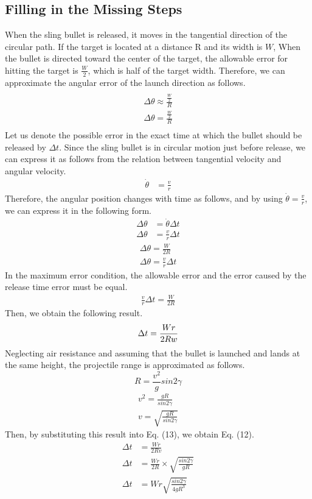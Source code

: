 \documentclass[11pt,letterpaper]{article}
\begin{document}
\subsection{Filling in the Missing Steps}
When the sling bullet is released, it moves in the tangential direction of the circular path. If the target is located at a distance R and its width is $W$, When the bullet is directed toward the center of the target, the allowable error for hitting the target is $\frac{W}{2}$, which is half of the target width. Therefore, we can approximate the angular error of the launch direction as follows.
\begin{align*}
\\
\Delta\theta\approx \frac{\frac{W}{2}}{R}\\[0.5em]
\Delta\theta= \frac{\frac{W}{2}}{R}\\
\end{align*}
Let us denote the possible error in the exact time at which the bullet should be released by $\Delta t$. Since the sling bullet is in circular motion just before release, we can express it as follows from the relation between tangential velocity and angular velocity.
\begin{align*}
\dot{\theta}&=\frac{v}{r}
\end{align*}
Therefore, the angular position changes with time as follows, and by using $\dot{\theta}=\frac{v}{r}$, we can express it in the following form.
\begin{align*}
\Delta\theta&=\dot{\theta}\Delta t\\
\Delta\theta&=\frac{v}{r}\Delta t
\end{align*}
\begin{align*}
\Delta\theta = \frac{W}{2R}\\[0.5em]
\Delta\theta = \frac{v}{r}{\Delta t}
\end{align*}
In the maximum error condition, the allowable error and the error caused by the release time error must be equal.
\begin{align*}
\frac{v}{r}\Delta t= \frac{W}{2R}
\end{align*}
Then, we obtain the following result.
\begin{equation}
\Delta t = \frac{Wr}{2Rw}\\[0.5em]
\end{equation}
Neglecting air resistance and assuming that the bullet is launched and lands at the same height, the projectile range is approximated as follows.
\begin{equation}
R = \frac{v^2}{g}sin2\gamma
\end{equation}
\begin{align*}
v^2 = \frac{gR}{sin2\gamma}\\[0.5em]
v=\sqrt{\frac{gR}{sin2\gamma}}
\end{align*}
Then, by substituting this result into Eq. (13), we obtain Eq. (12).
\begin{align*}
\Delta t &= \frac{Wr}{2Rv}\\[0.5em]
\Delta t &= \frac{Wr}{2R}\times\sqrt{\frac{sin2\gamma}{gR}}\\[0.5em]
\Delta t &= Wr\sqrt{\frac{sin2\gamma}{4gR^3}}
\end{align*}
\end{document}
